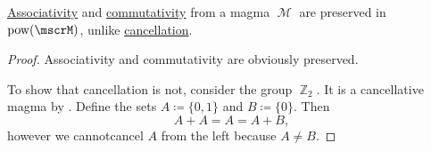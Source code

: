 \begin{proposition}\label{thm:power_set_magma_preservation}
  \hyperref[def:magma/associative]{Associativity} and \hyperref[def:magma/commutative]{commutativity} from a magma \( \mscrM \) are preserved in \( \pow(\mscrM) \), unlike \hyperref[def:magma/cancellative]{cancellation}.
\end{proposition}
\begin{proof}
  Associativity and commutativity are obviously preserved.

  To show that cancellation is not, consider the group \hyperref[def:group_of_integers_modulo]{\( \BbbZ_2 \)}. It is a cancellative magma by . Define the sets \( A \coloneqq \{ 0, 1 \} \) and \( B \coloneqq \{ 0 \} \). Then
  \begin{equation*}
    A + A = A = A + B,
  \end{equation*}
  however we cannot\LEM cancel \( A \) from the left because \( A \neq B \).
\end{proof}

